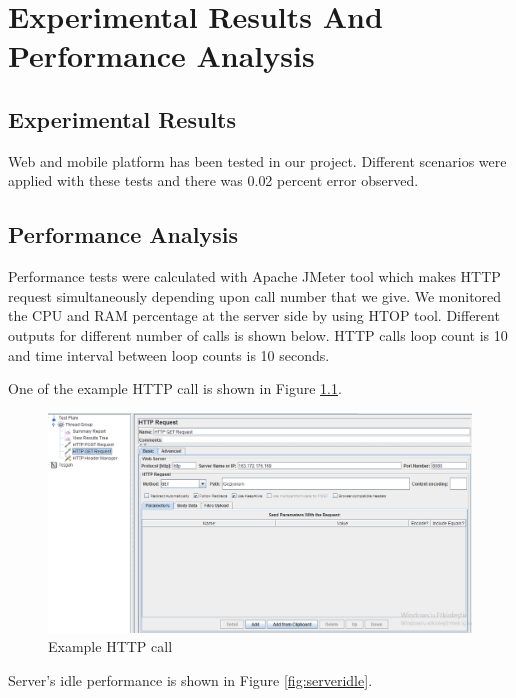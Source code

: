 \chapter{Experimental Results And Performance Analysis}


\section{Experimental Results}
Web and mobile platform has been tested in our project. Different scenarios were applied with these tests and there was 0.02 percent error observed.

\section{Performance Analysis}

Performance tests were calculated with Apache JMeter tool which makes HTTP request simultaneously depending upon call number that we give. We monitored the CPU and RAM percentage at the server side by using HTOP tool. Different outputs for different number of calls is shown below. HTTP calls loop count is 10 and time interval between loop counts is 10 seconds.

One of the example HTTP call is shown in Figure 
\ref{fig:exampleCall}.

\begin{figure}[!htbp]
\centering
\includegraphics[width=\textwidth]{projectChapters/images/exampleCall.png}
\caption{Example HTTP call}
\label{fig:exampleCall}
\end{figure}

\newpage

Server's idle performance is shown in Figure 
\ref{fig:serveridle}.

